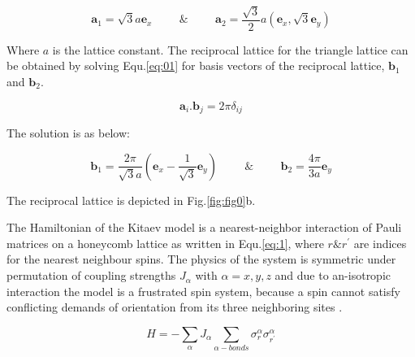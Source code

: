 \documentclass{article}
\begin{document}
\begin{equation}\label{eq:0}
    \textbf{a}_1 = \sqrt{3} a \textbf{e}_x \hspace{1cm} \& \hspace{1cm}
    \textbf{a}_2 = \frac{\sqrt{3}}{2} a (\textbf{e}_x, \sqrt{3}\textbf{e}_y)
\end{equation}

Where $a$ is the lattice constant. The reciprocal lattice for the triangle lattice can be obtained by solving Equ.\hspace{0.2mm}\ref{eq:01} for basis vectors of the reciprocal lattice, $\textbf{b}_1$ and $\textbf{b}_2$.

\begin{equation}\label{eq:01}
    \textbf{a}_i.\textbf{b}_j = 2\pi\delta_{ij}
\end{equation}

The solution is as below:

\begin{equation}\label{eq:02}
    \textbf{b}_1 = \frac{2\pi}{\sqrt{3}a} (\textbf{e}_x-\frac{1}{\sqrt{3}}\textbf{e}_y) \hspace{1cm} \& \hspace{1cm}
    \textbf{b}_2 = \frac{4\pi}{3a} \textbf{e}_y
\end{equation}

The reciprocal lattice is depicted in Fig.\hspace{0.2mm}\ref{fig:fig0}b. 

The Hamiltonian of the Kitaev model is a nearest-neighbor interaction of Pauli matrices on a honeycomb lattice as written in Equ.\hspace{0.2mm}\ref{eq:1}, where $r \& r^{'}$ are indices for the nearest neighbour spins. The physics of the system is symmetric under permutation of coupling strengths $J_{\alpha}$ with $\alpha = x, y, z$ and due to an-isotropic interaction the model is a frustrated spin system, because a spin cannot satisfy conflicting
 demands of orientation from its three neighboring sites \cite{Kitaev_2006}.

\begin{equation}\label{eq:1}
    H = - \sum_{\alpha} J_{\alpha} \sum_{\alpha-bonds} \sigma^{\alpha}_{r}\sigma^{\alpha}_{r^{'}}
\end{equation}
\end{document}
